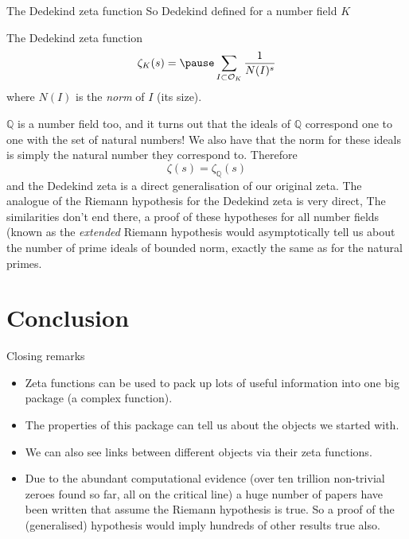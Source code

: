 \documentclass{beamer}
\begin{document}
\begin{frame}{The Dedekind zeta function}
So Dedekind defined for a number field $K$
\begin{block}{The Dedekind zeta function}
\[\zeta_K(s) = \pause \sum_{I\subset \mathcal{O}_K} \frac{1}{N(I)^s}\]
where $N(I)$ is the \emph{norm} of $I$ (its size).
\end{block}
\pause $\mathbb{Q}$ is a number field too, and it turns out that the ideals of $\mathbb{Q}$ correspond one to one with the set of natural numbers!
We also have that the norm for these ideals is simply the natural number they correspond to.
\pause Therefore
\[\zeta(s) = \zeta_\mathbb{Q}(s)\]
and the Dedekind zeta is a direct generalisation of our original zeta.
\pause The analogue of the Riemann hypothesis for the Dedekind zeta is very direct, 
\pause The similarities don't end there, a proof of these hypotheses for all number fields (known as the \emph{extended} Riemann hypothesis would asymptotically tell us about the number of prime ideals of bounded norm, exactly the same as for the natural primes.
\end{frame}

\section{Conclusion}
\begin{frame}{Closing remarks}
\begin{itemize}
\item Zeta functions can be used to pack up lots of useful information into one big package (a complex function).
\pause\item The properties of this package can tell us about the objects we started with.
\pause\item We can also see links between different objects via their zeta functions.
\pause\item Due to the abundant computational evidence (over ten trillion non-trivial zeroes found so far, all on the critical line) a huge number of papers have been written that assume the Riemann hypothesis is true.
So a proof of the (generalised) hypothesis would imply hundreds of other results true also.
\end{itemize}
\end{frame}
\end{document}
